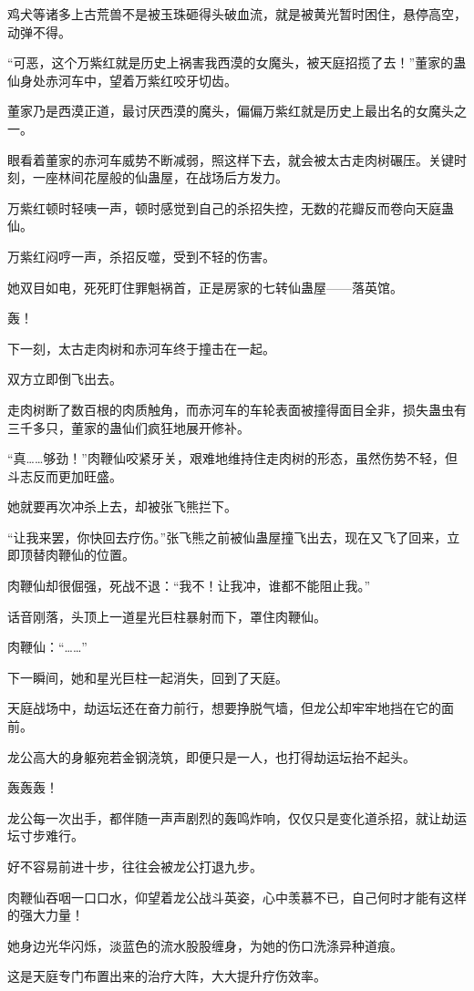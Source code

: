 \begin{this_body}
鸡犬等诸多上古荒兽不是被玉珠砸得头破血流，就是被黄光暂时困住，悬停高空，动弹不得。

“可恶，这个万紫红就是历史上祸害我西漠的女魔头，被天庭招揽了去！”董家的蛊仙身处赤河车中，望着万紫红咬牙切齿。

董家乃是西漠正道，最讨厌西漠的魔头，偏偏万紫红就是历史上最出名的女魔头之一。

眼看着董家的赤河车威势不断减弱，照这样下去，就会被太古走肉树碾压。关键时刻，一座林间花屋般的仙蛊屋，在战场后方发力。

万紫红顿时轻咦一声，顿时感觉到自己的杀招失控，无数的花瓣反而卷向天庭蛊仙。

万紫红闷哼一声，杀招反噬，受到不轻的伤害。

她双目如电，死死盯住罪魁祸首，正是房家的七转仙蛊屋——落英馆。

轰！

下一刻，太古走肉树和赤河车终于撞击在一起。

双方立即倒飞出去。

走肉树断了数百根的肉质触角，而赤河车的车轮表面被撞得面目全非，损失蛊虫有三千多只，董家的蛊仙们疯狂地展开修补。

“真……够劲！”肉鞭仙咬紧牙关，艰难地维持住走肉树的形态，虽然伤势不轻，但斗志反而更加旺盛。

她就要再次冲杀上去，却被张飞熊拦下。

“让我来罢，你快回去疗伤。”张飞熊之前被仙蛊屋撞飞出去，现在又飞了回来，立即顶替肉鞭仙的位置。

肉鞭仙却很倔强，死战不退：“我不！让我冲，谁都不能阻止我。”

话音刚落，头顶上一道星光巨柱暴射而下，罩住肉鞭仙。

肉鞭仙：“……”

下一瞬间，她和星光巨柱一起消失，回到了天庭。

天庭战场中，劫运坛还在奋力前行，想要挣脱气墙，但龙公却牢牢地挡在它的面前。

龙公高大的身躯宛若金钢浇筑，即便只是一人，也打得劫运坛抬不起头。

轰轰轰！

龙公每一次出手，都伴随一声声剧烈的轰鸣炸响，仅仅只是变化道杀招，就让劫运坛寸步难行。

好不容易前进十步，往往会被龙公打退九步。

肉鞭仙吞咽一口口水，仰望着龙公战斗英姿，心中羡慕不已，自己何时才能有这样的强大力量！

她身边光华闪烁，淡蓝色的流水股股缠身，为她的伤口洗涤异种道痕。

这是天庭专门布置出来的治疗大阵，大大提升疗伤效率。


\end{this_body}
